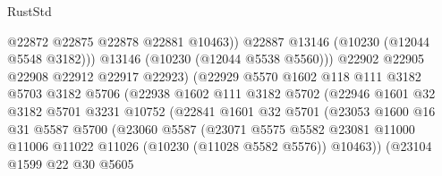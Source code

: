 \begin{lexlean}{RustStd}
\begin{coremodule}
                                    @22872
                                    @22875
                                    @22878
                                    @22881
                                    @10463))
                                @22887
                                @13146
                                (@10230 (@12044 @5548 @3182)))
                              @13146
                              (@10230 (@12044 @5538 @5560)))
                            @22902
                            @22905
                            @22908
                            @22912
                            @22917
                            @22923)
                          (@22929
                            @5570
                            @1602
                            @118
                            @111
                            @3182
                            @5703
                            @3182
                            @5706
                            (@22938
                              @1602
                              @111
                              @3182
                              @5702
                              (@22946
                                @1601
                                @32
                                @3182
                                @5701
                                @3231
                                @10752
                                (@22841
                                  @1601
                                  @32
                                  @5701
                                  (@23053
                                    @1600
                                    @16
                                    @31
                                    @5587
                                    @5700
                                    (@23060
                                      @5587
                                      (@23071
                                        @5575
                                        @5582
                                        @23081
                                        @11000
                                        @11006
                                        @11022
                                        @11026
                                        (@10230 (@11028 @5582 @5576))
                                        @10463))
                                    (@23104
                                      @1599
                                      @22
                                      @30
                                      @5605

\end{coremodule}
\end{lexlean}
